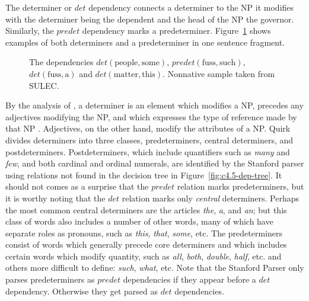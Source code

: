 \documentclass[main.tex]{subfiles}
\begin{document}
The determiner or $det$ dependency connects a determiner to the NP it modifies with the determiner being the dependent and the head of the NP the governor. Similarly, the $predet$ dependency marks a predeterminer. Figure~\ref{ex:det} shows examples of both determiners and a predeterminer in one sentence fragment. 
\begin{figure}[ht]
\centering
{}
\caption{The dependencies $det(\text{people},\text{some})$, $predet(\text{fuss},\text{such})$, $det(\text{fuss},\text{a})$ and $det(\text{matter},\text{this})$. Nonnative sample taken from SULEC.}
\label{ex:det}
\end{figure}
By the analysis of \citeauthor{quirk:1985}, a determiner is an element which modifies a NP, precedes any adjectives modifying the NP, and which expresses the type of reference made by that NP \citep[Ch. 5.10]{quirk:1985}. Adjectives, on the other hand, modify the attributes of a NP. Quirk divides determiners into three classes, predeterminers, central determiners, and postdeterminers. Postdeterminers, which include quantifiers such as \textit{many} and \textit{few}, and both cardinal and ordinal numerals, are identified by the Stanford parser using relations not found in the decision tree in Figure~\ref{fig:c4.5-dep-tree}. It should not comes as a surprise that the $predet$ relation marks predeterminers, but it is worthy noting that the $det$ relation marks only \textit{central} determiners. Perhaps the most common central determiners are the articles \textit{the}, \textit{a}, and \textit{an}; but this class of words also includes a number of other words, many of which have separate roles as pronouns, such as \textit{this}, \textit{that}, \textit{some}, etc. The predeterminers consist of words which generally precede core determiners and which includes certain words which modify quantity, such as \textit{all}, \textit{both}, \textit{double}, \textit{half}, etc. and others more difficult to define: \textit{such}, \textit{what}, etc. Note that the Stanford Parser only parses predeterminers as $predet$ dependencies if they appear before a $det$ dependency. Otherwise they get parsed as $det$ dependencies.
\end{document}
